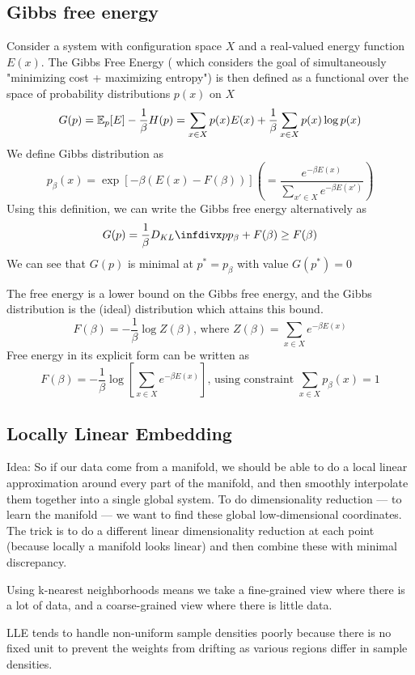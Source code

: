 \documentclass[12pt]{article}
\begin{document}
\subsection{Gibbs free energy}
Consider a system with configuration space $X$ and a real-valued energy function $E(x)$. The Gibbs Free Energy ( which
considers the goal of simultaneously "minimizing cost + maximizing entropy") is then defined as a functional over the space of probability distributions $p(x)$ on $X$
\[ G(p) = \operatorname{\mathbb{E}}_p [E] - \frac{1}{\beta} H(p) = \sum_{x\in X} p(x)E(x) + \frac{1}{\beta} \sum_{x\in X} p(x) \log p(x) \]
We define Gibbs distribution as
\[ p_{\beta}(x) = \exp [-\beta (E(x) - F(\beta)) ] \left( = \frac{e^{-\beta E(x)}}{\sum_{x'\in X} e^{-\beta E(x')}} \right) \]
Using this definition, we can write the Gibbs free energy alternatively as
\[ G(p) = \frac{1}{\beta}\dkl{p}{p_{\beta}} + F(\beta) \geq F(\beta) \]
We can see that $G(p)$ is minimal at $p^* = p_{\beta}$ with value $G(p^*) = 0$
\par The free energy is a lower bound on the Gibbs free energy, and the Gibbs distribution is the (ideal) distribution which attains this bound.
\[ F(\beta) = -\frac{1}{\beta}\log Z(\beta) \text{, where } Z(\beta) = \sum_{x\in X} e^{-\beta E(x)} \]
Free energy in its explicit form can be written as
\[ F(\beta) = -\frac{1}{\beta} \log \left[ \sum_{x\in X} e^{-\beta E(x)} \right]
 \text{, using constraint } \sum_{x\in X} p_{\beta}(x) = 1 \]

\subsection{Locally Linear Embedding}
\par Idea: So if our data come from a manifold, we should be able to do a local linear approximation around every part of the manifold, and then smoothly interpolate them together into a single global system. To do dimensionality reduction — to learn the manifold — we want to find these global low-dimensional coordinates. The trick is to do a different linear dimensionality reduction at each point (because locally a manifold looks linear) and then combine these with minimal discrepancy.
\par Using k-nearest neighborhoods means we take a fine-grained view where there is a lot of data, and a coarse-grained view where there is little data.
\par LLE tends to handle non-uniform sample densities poorly because there is no fixed unit to prevent the weights from drifting as various regions differ in sample densities.
\end{document}

